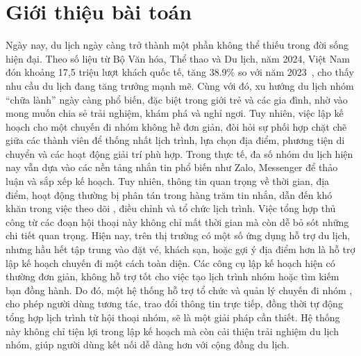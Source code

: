 \section{Giới thiệu bài toán}

Ngày nay, du lịch ngày càng trở thành một phần không thể thiếu trong đời sống hiện đại.
Theo số liệu từ Bộ Văn hóa, Thể thao và Du lịch, năm 2024, Việt Nam đón khoảng 17,5 triệu lượt khách quốc tế, tăng 38.9\% so với năm 2023~\cite{bvhttdl2024}, cho thấy nhu cầu du lịch đang tăng
trưởng mạnh mẽ. Cùng với đó, xu hướng du lịch nhóm ``chữa lành'' ngày càng phổ biến, đặc biệt trong giới trẻ và các gia đình, nhờ vào mong muốn chia sẻ trải nghiệm, khám phá và nghỉ ngơi.\nl
\indent Tuy nhiên, việc lập kế hoạch cho một chuyến đi nhóm không hề đơn giản, đòi hỏi sự phối hợp chặt chẽ giữa các thành viên để thống nhất lịch trình, lựa chọn địa điểm, 
phương tiện di chuyển và các hoạt động giải trí phù hợp. 
Trong thực tế, đa số nhóm du lịch hiện nay vẫn 
dựa vào các nền tảng nhắn tin phổ biến như Zalo, Messenger 
để thảo luận và sắp xếp kế hoạch. Tuy nhiên, 
thông tin quan trọng về 
thời gian, địa điểm, hoạt động thường bị phân tán trong 
hàng trăm tin nhắn, dẫn đến khó khăn trong việc theo dõi
, điều chỉnh và tổ chức lịch trình. Việc tổng hợp thủ công từ
 các đoạn hội thoại này không chỉ mất thời gian mà còn
  dễ bỏ sót những chi tiết quan trọng. \nl
\indent Hiện nay, trên thị trường có một số ứng dụng hỗ trợ du lịch, nhưng hầu hết tập trung vào đặt vé, khách sạn, hoặc gợi ý địa điểm hơn là hỗ trợ lập kế hoạch chuyến đi một cách toàn diện. Các công cụ lập kế hoạch hiện có thường đơn giản, không hỗ trợ tốt cho việc tạo lịch trình nhóm hoặc tìm kiếm bạn đồng hành. Do đó, một hệ thống hỗ trợ tổ chức và quản lý chuyến đi nhóm
, cho phép người dùng tương tác, trao đổi thông tin trực tiếp, 
đồng thời tự động tổng hợp lịch trình từ hội thoại nhóm,
 sẽ là một giải pháp cần thiết. Hệ thống này không chỉ tiện lợi trong lập kế hoạch mà còn 
 cải thiện trải nghiệm du lịch nhóm, 
 giúp người dùng kết nối dễ dàng hơn với cộng đồng du lịch.\nl
